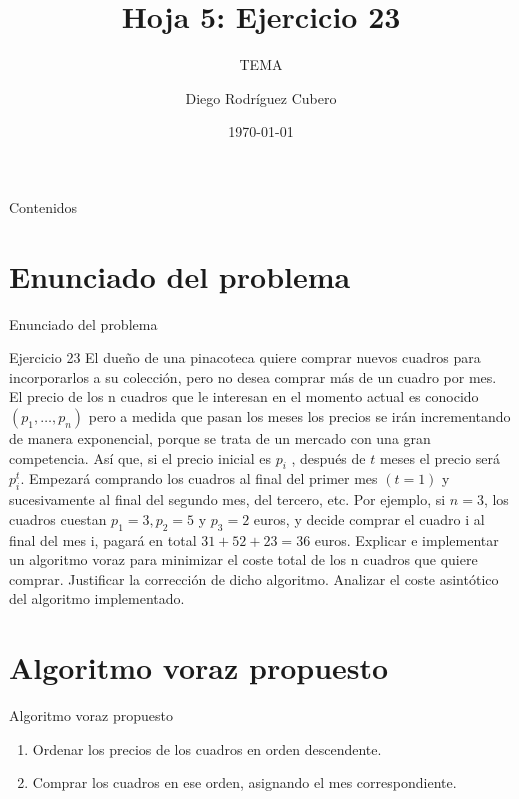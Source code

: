 \documentclass[aspectratio=169]{beamer}
\title{Hoja 5: Ejercicio 23}
\subtitle{TEMA}
\author{Diego Rodríguez Cubero}
\institute{UCM}
\date{\today}
\begin{document}
\begin{frame}
    \titlepage
\end{frame}

\begin{frame}{Contenidos}
    \tableofcontents
\end{frame}

\section{Enunciado del problema}
\begin{frame}{Enunciado del problema}
    \begin{block}{Ejercicio 23}
    El dueño de una pinacoteca quiere comprar nuevos cuadros para incorporarlos a su colección, pero no desea comprar más de un cuadro por mes. El precio de los n cuadros que le interesan en el momento actual es conocido $(p_1, \ldots , p_n)$ pero a medida que pasan los meses los precios se irán incrementando de manera exponencial, porque se trata de un mercado con una gran competencia. Así que, si el precio inicial es $p_i$ , después de $t$ meses el precio será $p_i^t$. Empezará comprando los cuadros al final del primer mes $(t = 1)$ y sucesivamente al final del segundo mes, del tercero, etc. Por ejemplo, si $n = 3$, los cuadros cuestan $p_1 = 3, p_2 = 5$ y $p_3 = 2$ euros, y decide comprar el cuadro i al final del mes i, pagará en total $31 + 52 + 23 = 36$ euros. Explicar e implementar un algoritmo voraz para minimizar el coste total de los n cuadros que quiere comprar. Justificar la corrección de dicho algoritmo. Analizar el coste asintótico del algoritmo implementado.
    \end{block}
\end{frame}

\section{Algoritmo voraz propuesto}
\begin{frame}{Algoritmo voraz propuesto}
    \begin{enumerate}
        \item Ordenar los precios de los cuadros en orden descendente.
        \item Comprar los cuadros en ese orden, asignando el mes correspondiente.
    \end{enumerate}
\end{frame}
\end{document}
